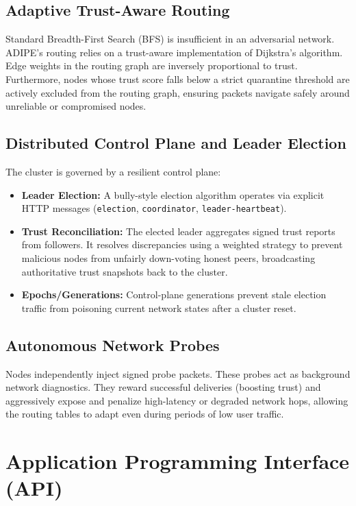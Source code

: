 \documentclass[12pt]{article}
\begin{document}
\subsection{Adaptive Trust-Aware Routing}
Standard Breadth-First Search (BFS) is insufficient in an adversarial network. ADIPE's routing relies on a trust-aware implementation of Dijkstra's algorithm. Edge weights in the routing graph are inversely proportional to trust. Furthermore, nodes whose trust score falls below a strict quarantine threshold are actively excluded from the routing graph, ensuring packets navigate safely around unreliable or compromised nodes.

\subsection{Distributed Control Plane and Leader Election}
The cluster is governed by a resilient control plane:
\begin{itemize}
    \item \textbf{Leader Election:} A bully-style election algorithm operates via explicit HTTP messages (\texttt{election}, \texttt{coordinator}, \texttt{leader-heartbeat}).
    \item \textbf{Trust Reconciliation:} The elected leader aggregates signed trust reports from followers. It resolves discrepancies using a weighted strategy to prevent malicious nodes from unfairly down-voting honest peers, broadcasting authoritative trust snapshots back to the cluster.
    \item \textbf{Epochs/Generations:} Control-plane generations prevent stale election traffic from poisoning current network states after a cluster reset.
\end{itemize}

\subsection{Autonomous Network Probes}
Nodes independently inject signed probe packets. These probes act as background network diagnostics. They reward successful deliveries (boosting trust) and aggressively expose and penalize high-latency or degraded network hops, allowing the routing tables to adapt even during periods of low user traffic.

\section{Application Programming Interface (API)}
\end{document}
